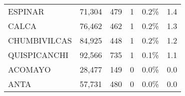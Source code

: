 \begin{tabular}{@{}lrrrrr@{}}
	\cellcolor[HTML]{FFFC9E}ESPINAR       & 71,304                                                         & 479                                                                  & 1                                                              & 0.2\%                                                                  & 1.4                                                                                                                                \\
	\cellcolor[HTML]{FFFC9E}CALCA         & 76,462                                                         & 462                                                                  & 1                                                              & 0.2\%                                                                  & 1.3                                                                                                                                \\
	\cellcolor[HTML]{9AFF99}CHUMBIVILCAS  & 84,925                                                         & 448                                                                  & 1                                                              & 0.2\%                                                                  & 1.2                                                                                                                                \\
	\cellcolor[HTML]{9AFF99}QUISPICANCHI  & 92,566                                                         & 735                                                                  & 1                                                              & 0.1\%                                                                  & 1.1                                                                                                                                \\
	\cellcolor[HTML]{9AFF99}ACOMAYO       & 28,477                                                         & 149                                                                  & 0                                                              & 0.0\%                                                                  & 0.0                                                                                                                                \\
	\cellcolor[HTML]{9AFF99}ANTA          & 57,731                                                         & 480                                                                  & 0                                                              & 0.0\%                                                                  & 0.0                                                                                                                                \\

\end{tabular}
